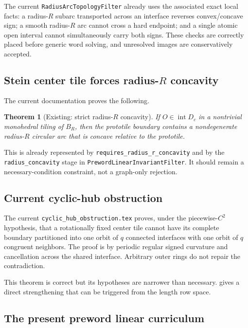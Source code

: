 \documentclass[11pt]{article}
\newtheorem{theorem}{Theorem}[section]
\theoremstyle{definition}
\theoremstyle{remark}
\newcommand{\BR}{B_R}
\newcommand{\interior}{\operatorname{int}}
\begin{document}
The current \texttt{RadiusArcTopologyFilter} already uses the associated exact local facts: a radius-$R$ subarc transported across an interface reverses convex/concave sign; a smooth radius-$R$ arc cannot cross a hard endpoint; and a single atomic open interval cannot simultaneously carry both signs.  These checks are correctly placed before generic word solving, and unresolved images are conservatively accepted.

\subsection{Stein center tile forces radius-$R$ concavity}

The current documentation proves the following.

\begin{theorem}[Existing: strict radius-$R$ concavity]
If $O\in\interior D_c$ in a nontrivial monohedral tiling of $\BR$, then the prototile boundary contains a nondegenerate radius-$R$ circular arc that is concave relative to the prototile.
\end{theorem}

This is already represented by \texttt{requires\_radius\_r\_concavity} and by the \texttt{radius\_concavity} stage in \texttt{PrewordLinearInvariantFilter}.  It should remain a necessary-condition constraint, not a graph-only rejection.

\subsection{Current cyclic-hub obstruction}

The current \texttt{cyclic\_hub\_obstruction.tex} proves, under the piecewise-$C^2$ hypothesis, that a rotationally fixed center tile cannot have its complete boundary partitioned into one orbit of $q$ connected interfaces with one orbit of $q$ congruent neighbors.  The proof is by periodic regular signed curvature and cancellation across the shared interface.  Arbitrary outer rings do not repair the contradiction.

This theorem is correct but its hypotheses are narrower than necessary.   gives a direct strengthening that can be triggered from the length row space.

\subsection{The present preword linear curriculum}
\end{document}
